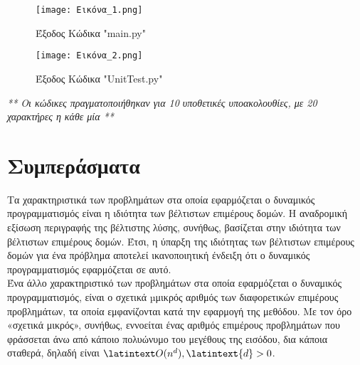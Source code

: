 \documentclass[a4paper,12pt]{report}
\newcommand{\lat} {\latintext}
\begin{document}
	\begin{figure}[h]
		\centering
		\texttt{[image: Εικόνα\_1.png]}
		\caption{Έξοδος Κώδικα {\lat "main.py"}}
		\label{fig:}
	\end{figure}
	
	
	\begin{figure}[h]
		\centering
		\texttt{[image: Εικόνα\_2.png]}
		\caption{Έξοδος Κώδικα {\lat "UnitTest.py"}}
		\label{fig:2}
	\end{figure}
	
	

	\emph {** Οι κώδικες πραγματοποιήθηκαν για 10 υποθετικές υποακολουθίες, με 20 χαρακτήρες η κάθε μία **}
	
	\vspace{0.5cm}
	
	
	\section{Συμπεράσματα}
	Τα χαρακτηριστικά των προβλημάτων στα οποία εφαρμόζεται ο δυναμικός προγραμματισμός είναι η ιδιότητα των βέλτιστων επιμέρους δομών. H αναδρομική εξίσωση περιγραφής της βέλτιστης λύσης, συνήθως, βασίζεται στην ιδιότητα των βέλτιστων επιμέρους δομών. Έτσι, η ύπαρξη της ιδιότητας των βέλτιστων επιμέρους δομών για ένα πρόβλημα αποτελεί ικανοποιητική ένδειξη ότι ο δυναμικός προγραμματισμός εφαρμόζεται σε αυτό.  
	\\Ένα άλλο χαρακτηριστικό των προβλημάτων στα οποία εφαρμόζεται ο δυναμικός προγραμματισμός, είναι ο σχετικά µμικρός αριθμός των διαφορετικών επιμέρους προβλημάτων, τα οποία εμφανίζονται κατά την εφαρμογή της μεθόδου. Με τον όρο «σχετικά μικρός», συνήθως, εννοείται ένας αριθμός επιμέρους προβλημάτων που φράσσεται άνω από κάποιο πολυώνυμο του μεγέθους της εισόδου, δια κάποια σταθερά, δηλαδή είναι ${\lat O({n}^{d})} , {\lat {d}>{0}}$.
	
\end{document}
